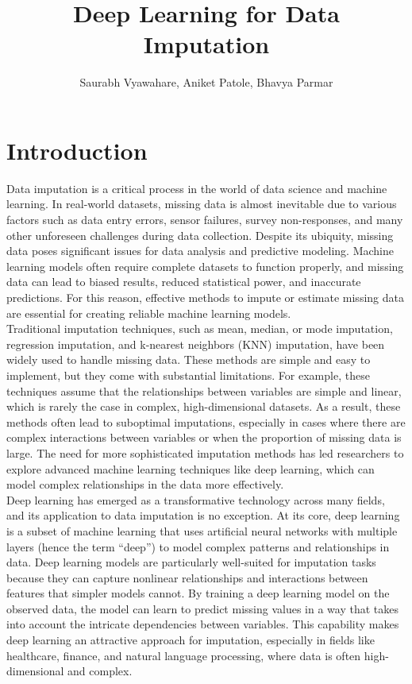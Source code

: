 \documentclass{article}
\title{Deep Learning for Data Imputation}
\author{Saurabh Vyawahare, Aniket Patole, Bhavya Parmar}
\begin{document}
\maketitle

\tableofcontents
\pagebreak
\section{Introduction}
Data imputation is a critical process in the world of data science and machine learning. In real-world datasets, missing data is almost inevitable due to various factors such as data entry errors, sensor failures, survey non-responses, and many other unforeseen challenges during data collection. Despite its ubiquity, missing data poses significant issues for data analysis and predictive modeling. Machine learning models often require complete datasets to function properly, and missing data can lead to biased results, reduced statistical power, and inaccurate predictions. For this reason, effective methods to impute or estimate missing data are essential for creating reliable machine learning models.
\\
Traditional imputation techniques, such as mean, median, or mode imputation, regression imputation, and k-nearest neighbors (KNN) imputation, have been widely used to handle missing data. These methods are simple and easy to implement, but they come with substantial limitations. For example, these techniques assume that the relationships between variables are simple and linear, which is rarely the case in complex, high-dimensional datasets. As a result, these methods often lead to suboptimal imputations, especially in cases where there are complex interactions between variables or when the proportion of missing data is large. The need for more sophisticated imputation methods has led researchers to explore advanced machine learning techniques like deep learning, which can model complex relationships in the data more effectively.
\\
Deep learning has emerged as a transformative technology across many fields, and its application to data imputation is no exception. At its core, deep learning is a subset of machine learning that uses artificial neural networks with multiple layers (hence the term “deep”) to model complex patterns and relationships in data. Deep learning models are particularly well-suited for imputation tasks because they can capture nonlinear relationships and interactions between features that simpler models cannot. By training a deep learning model on the observed data, the model can learn to predict missing values in a way that takes into account the intricate dependencies between variables. This capability makes deep learning an attractive approach for imputation, especially in fields like healthcare, finance, and natural language processing, where data is often high-dimensional and complex.
\end{document}
